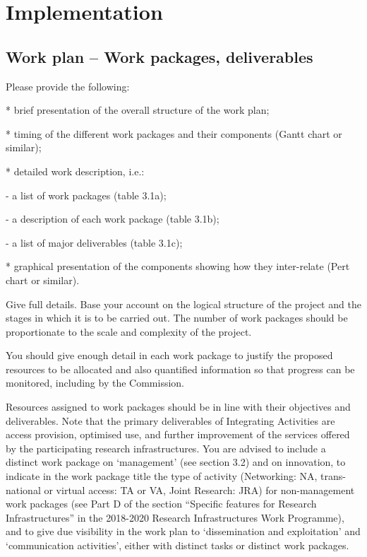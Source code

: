 \chapter{Implementation}\label{chap:implementation}

\section{Work plan -- Work packages, deliverables}

\begin{todo}{}\color{red}
  Please provide the following:

  * brief presentation of the overall structure of the work plan;
  
  * timing of the different work packages and their components (Gantt chart or similar);

  * detailed work description, i.e.:
  
        - a list of work packages (table 3.1a);

        - a description of each work package (table 3.1b);

        - a list of major deliverables (table 3.1c);

  * graphical presentation of the components showing how they inter-relate (Pert chart or similar).

  Give full details. Base your account on the logical structure of the project and the stages in which it is to be carried out. The number of work packages should be proportionate to the scale and complexity of the project.

  You should give enough detail in each work package to justify the proposed resources to be allocated and also quantified information so that progress can be monitored, including by the Commission.

  Resources assigned to work packages should be in line with their objectives and deliverables. Note that the primary deliverables of Integrating Activities are access provision, optimised use, and further improvement of the services offered by the participating research infrastructures. You are advised to include a distinct work package on ‘management’ (see section 3.2) and on innovation, to indicate in the work package title the type of activity (Networking: NA, trans-national or virtual access: TA or VA, Joint Research: JRA) for non-management work packages (see Part D of the section “Specific features for Research Infrastructures” in the 2018-2020 Research Infrastructures Work Programme), and to give due visibility in the work plan to ‘dissemination and exploitation’ and ‘communication activities’, either with distinct tasks or distinct work packages.


\end{todo}
